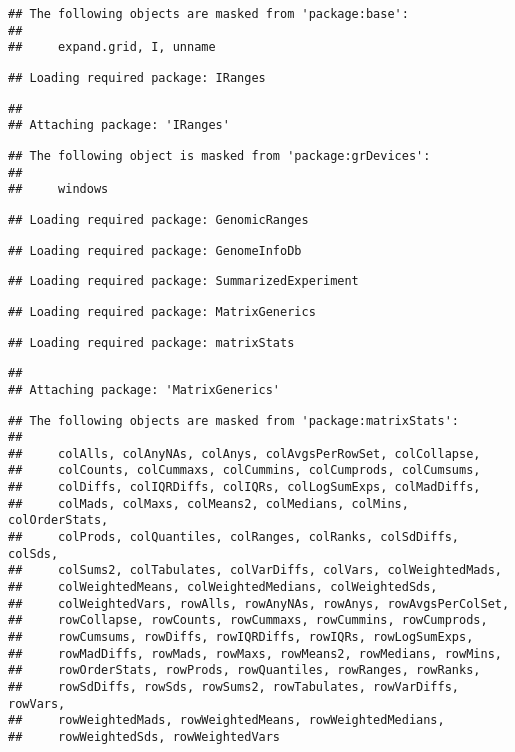 \documentclass[
]{article}
\begin{document}
\begin{verbatim}
## The following objects are masked from 'package:base':
## 
##     expand.grid, I, unname
\end{verbatim}

\begin{verbatim}
## Loading required package: IRanges
\end{verbatim}

\begin{verbatim}
## 
## Attaching package: 'IRanges'
\end{verbatim}

\begin{verbatim}
## The following object is masked from 'package:grDevices':
## 
##     windows
\end{verbatim}

\begin{verbatim}
## Loading required package: GenomicRanges
\end{verbatim}

\begin{verbatim}
## Loading required package: GenomeInfoDb
\end{verbatim}

\begin{verbatim}
## Loading required package: SummarizedExperiment
\end{verbatim}

\begin{verbatim}
## Loading required package: MatrixGenerics
\end{verbatim}

\begin{verbatim}
## Loading required package: matrixStats
\end{verbatim}

\begin{verbatim}
## 
## Attaching package: 'MatrixGenerics'
\end{verbatim}

\begin{verbatim}
## The following objects are masked from 'package:matrixStats':
## 
##     colAlls, colAnyNAs, colAnys, colAvgsPerRowSet, colCollapse,
##     colCounts, colCummaxs, colCummins, colCumprods, colCumsums,
##     colDiffs, colIQRDiffs, colIQRs, colLogSumExps, colMadDiffs,
##     colMads, colMaxs, colMeans2, colMedians, colMins, colOrderStats,
##     colProds, colQuantiles, colRanges, colRanks, colSdDiffs, colSds,
##     colSums2, colTabulates, colVarDiffs, colVars, colWeightedMads,
##     colWeightedMeans, colWeightedMedians, colWeightedSds,
##     colWeightedVars, rowAlls, rowAnyNAs, rowAnys, rowAvgsPerColSet,
##     rowCollapse, rowCounts, rowCummaxs, rowCummins, rowCumprods,
##     rowCumsums, rowDiffs, rowIQRDiffs, rowIQRs, rowLogSumExps,
##     rowMadDiffs, rowMads, rowMaxs, rowMeans2, rowMedians, rowMins,
##     rowOrderStats, rowProds, rowQuantiles, rowRanges, rowRanks,
##     rowSdDiffs, rowSds, rowSums2, rowTabulates, rowVarDiffs, rowVars,
##     rowWeightedMads, rowWeightedMeans, rowWeightedMedians,
##     rowWeightedSds, rowWeightedVars
\end{verbatim}
\end{document}
